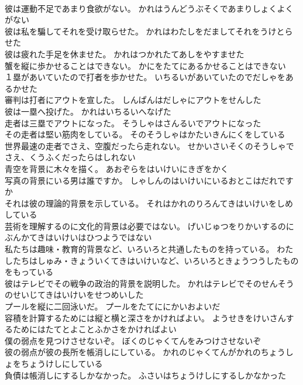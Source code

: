 \documentclass[8pt]{extreport}
\begin{document}
\begin{CJK}{UTF8}{min}
\\	彼は運動不足であまり食欲がない。	かれはうんどうぶそくであまりしょくよくがない 
\\	彼は私を騙してそれを受け取らせた。	かれはわたしをだましてそれをうけとらせた 
\\	彼は疲れた手足を休ませた。	かれはつかれたてあしをやすませた 
\\	蟹を縦に歩かせることはできない。	かにをたてにあるかせることはできない 
\\	１塁があいていたので打者を歩かせた。	いちるいがあいていたのでだしゃをあるかせた 
\\	審判は打者にアウトを宣した。	しんぱんはだしゃにアウトをせんした 
\\	彼は一塁へ投げた。	かれはいちるいへなげた 
\\	走者は三塁でアウトになった。	そうしゃはさんるいでアウトになった 
\\	その走者は堅い筋肉をしている。	そのそうしゃはかたいきんにくをしている 
\\	世界最速の走者でさえ、空腹だったら走れない。	せかいさいそくのそうしゃでさえ、くうふくだったらはしれない 
\\	青空を背景に木々を描く。	あおぞらをはいけいにきぎをかく 
\\	写真の背景にいる男は誰ですか。	しゃしんのはいけいにいるおとこはだれですか 
\\	それは彼の理論的背景を示している。	それはかれのりろんてきはいけいをしめしている 
\\	芸術を理解するのに文化的背景は必要ではない。	げいじゅつをりかいするのにぶんかてきはいけいはひつようではない 
\\	私たちは趣味・教育的背景など、いろいろと共通したものを持っている。	わたしたちはしゅみ・きょういくてきはいけいなど、いろいろときょうつうしたものをもっている 
\\	彼はテレビでその戦争の政治的背景を説明した。	かれはテレビでそのせんそうのせいじてきはいけいをせつめいした 
\\	プールを縦に二回泳いだ。	プールをたてににかいおよいだ 
\\	容積を計算するためには縦と横と深さをかければよい。	ようせきをけいさんするためにはたてとよことふかさをかければよい 
\\	僕の弱点を見つけさせないぞ。	ぼくのじゃくてんをみつけさせないぞ 
\\	彼の弱点が彼の長所を帳消しにしている。	かれのじゃくてんがかれのちょうしょをちょうけしにしている 
\\	負債は帳消しにするしかなかった。	ふさいはちょうけしにするしかなかった 

\end{CJK}
\end{document}
